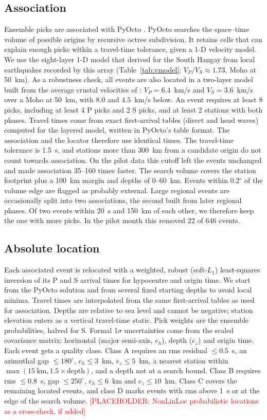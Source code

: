 \documentclass[11pt]{article}
\newcommand{\placeholder}[1]{\textcolor{red}{[PLACEHOLDER: #1]}}
\begin{document}
\subsection{Association}
Ensemble picks are associated with PyOcto \citep{munchmeyer2024}. PyOcto searches the space--time volume of possible origins by recursive octree subdivision. It retains cells that can explain enough picks within a travel-time tolerance, given a 1-D velocity model. We use the eight-layer 1-D model that \citet{dashdondog2020} derived for the South Hangay from local earthquakes recorded by this array (Table~\ref{tab:vmodel}; $V_P/V_S \approx 1.73$, Moho at 50~km). As a robustness check, all events are also located in a two-layer model built from the average crustal velocities of \citet{meltzer2019}: $V_P = 6.4$~km/s and $V_S = 3.6$~km/s over a Moho at 50~km, with $8.0$ and $4.5$~km/s below. An event requires at least 8 picks, including at least 4 P picks and 2 S picks, and at least 2 stations with both phases. Travel times come from exact first-arrival tables (direct and head waves) computed for the layered model, written in PyOcto's table format. The association and the locator therefore use identical times. The travel-time tolerance is 1.5~s, and stations more than 300~km from a candidate origin do not count towards association. On the pilot data this cutoff left the events unchanged and made association 35--160 times faster. The search volume covers the station footprint plus a 100~km margin and depths of 0--60~km. Events within 0.2$^\circ$ of the volume edge are flagged as probably external. Large regional events are occasionally split into two associations, the second built from later regional phases. Of two events within 20~s and 150~km of each other, we therefore keep the one with more picks. In the pilot month this removed 22 of 646 events.

\subsection{Absolute location}
Each associated event is relocated with a weighted, robust (soft-$L_1$) least-squares inversion of its P and S arrival times for hypocentre and origin time. We start from the PyOcto solution and from several fixed starting depths to avoid local minima. Travel times are interpolated from the same first-arrival tables as used for association. Depths are relative to sea level and cannot be negative; station elevation enters as a vertical travel-time static. Pick weights are the ensemble probabilities, halved for S. Formal 1$\sigma$ uncertainties come from the scaled covariance matrix: horizontal (major semi-axis, $e_h$), depth ($e_z$) and origin time. Each event gets a quality class. Class A requires an rms residual $\le 0.5$~s, an azimuthal gap $\le 180^\circ$, $e_h \le 3$~km, $e_z \le 5$~km, a nearest station within $\max(15~\text{km}, 1.5\times\text{depth})$, and a depth not at a search bound. Class B requires rms $\le 0.8$~s, gap $\le 250^\circ$, $e_h \le 6$~km and $e_z \le 10$~km. Class C covers the remaining located events, and class D marks events with rms above 1~s or at the edge of the search volume. \placeholder{NonLinLoc probabilistic locations \citep{lomax2000} as a cross-check, if added}
\end{document}
